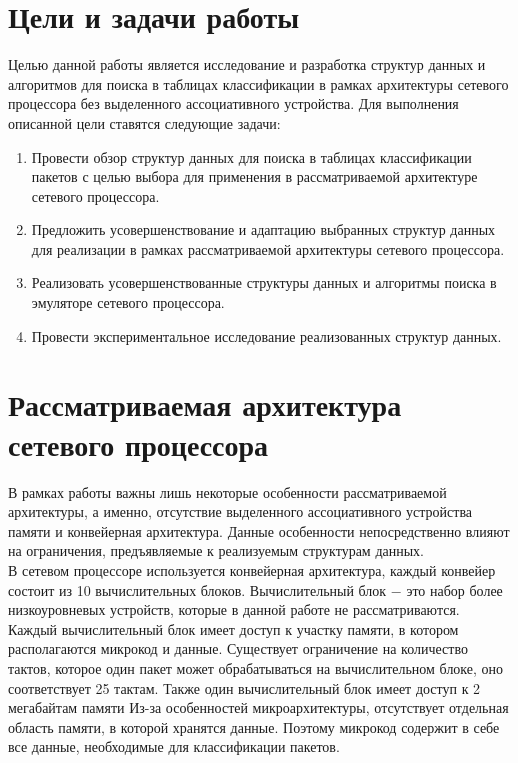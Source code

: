 \documentclass[a4peper, 12pt, titlepage, finall]{report}
\begin{document}
    \chapter{Цели и задачи работы}
        Целью данной работы является исследование и разработка структур данных и алгоритмов для поиска в таблицах классификации 
        в рамках архитектуры сетевого процессора без выделенного ассоциативного устройства.
        Для выполнения описанной цели ставятся следующие задачи:

        \begin{enumerate}
            \item Провести обзор структур данных для поиска в таблицах классификации пакетов с целью выбора для применения в рассматриваемой архитектуре сетевого процессора.
            \item Предложить усовершенствование и адаптацию выбранных структур данных для реализации в рамках рассматриваемой архитектуры сетевого процессора.
            \item Реализовать усовершенствованные структуры данных и алгоритмы поиска в эмуляторе сетевого процессора.
            \item Провести экспериментальное исследование реализованных структур данных.
        \end{enumerate}
       
    \chapter{Рассматриваемая архитектура сетевого процессора}
        В рамках работы важны лишь некоторые особенности рассматриваемой архитектуры, а именно, отсутствие выделенного ассоциативного устройства памяти и конвейерная архитектура. 
        Данные особенности непосредственно влияют на ограничения, предъявляемые к реализуемым структурам данных.\\
        В сетевом процессоре используется конвейерная архитектура, каждый конвейер состоит из 10 вычислительных блоков. 
        Вычислительный блок $-$ это набор более низкоуровневых устройств, которые в данной работе не рассматриваются. 
        Каждый вычислительный блок имеет доступ к участку памяти, в котором располагаются микрокод и данные.
        Существует ограничение на количество тактов, которое один пакет может обрабатываться на вычислительном блоке, оно соответствует 25 тактам.
        Также один вычислительный блок имеет доступ к 2 мегабайтам памяти
        Из-за особенностей микроархитектуры, отсутствует отдельная область памяти, в которой хранятся данные. Поэтому микрокод содержит в себе все данные,
        необходимые для классификации пакетов.
\end{document}
